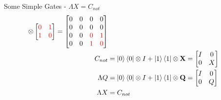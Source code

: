 \documentclass{beamer}
\begin{document}
\begin{frame}{Some Simple Gates - $\Lambda X = C_{not}$}
{\begin{align*}
      \otimes
      \begin{bmatrix}
        {\color{red}0} & {\color{red}1} \\
        {\color{red}1} & {\color{red}0} \\
      \end{bmatrix}
      =
      \begin{bmatrix}
        0 & 0 & 0 & 0 \\
        0 & 0 & 0 & 0 \\
        0 & 0 & {\color{red}0} & {\color{red}1} \\
        0 & 0 & {\color{red}1} & {\color{red}0} \\
      \end{bmatrix}
      \\
      C_{not} &= \ket0\bra0 \otimes I + \ket1\bra1 \otimes \mathbf{X} = \begin{bmatrix} I & 0 \\ 0 & X \end{bmatrix} \\
      \Lambda Q &= \ket0\bra0 \otimes I + \ket1\bra1 \otimes \mathbf{Q} = \begin{bmatrix} I & 0 \\ 0 & Q \end{bmatrix} \\
      \Lambda X &= C_{not}
    \end{align*}
  }%
\end{frame}
\end{document}
